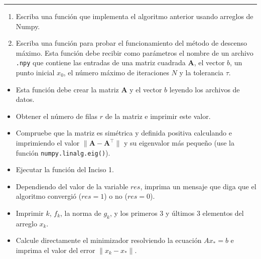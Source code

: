\documentclass[11pt]{article}
\providecommand{\tightlist}{%
      \setlength{\itemsep}{0pt}\setlength{\parskip}{0pt}}
\begin{document}
\begin{center}\rule{0.5\linewidth}{0.5pt}\end{center}

\begin{enumerate}
\def\labelenumi{\arabic{enumi}.}
\tightlist
\item
  Escriba una función que implementa el algoritmo anterior usando
  arreglos de Numpy.\\
\item
  Escriba una función para probar el funcionamiento del método de
  descenso máximo. Esta función debe recibir como parámetros el nombre
  de un archivo \texttt{.npy} que contiene las entradas de una matriz
  cuadrada \(\mathbf{A}\), el vector \(b\), un punto inicial \(x_0\), el
  número máximo de iteraciones \(N\) y la tolerancia \(\tau\).
\end{enumerate}

\begin{itemize}
\tightlist
\item
  Esta función debe crear la matriz \(\mathbf{A}\) y el vector \(b\)
  leyendo los archivos de datos.
\item
  Obtener el número de filas \(r\) de la matriz e imprimir este valor.
\item
  Compruebe que la matriz es simétrica y definida positiva calculando e
  imprimiendo el valor \(\|\mathbf{A} - \mathbf{A}^\top\|\) y su
  eigenvalor más pequeño (use la función \texttt{numpy.linalg.eig()}).
\item
  Ejecutar la función del Inciso 1.
\item
  Dependiendo del valor de la variable \(res\), imprima un mensaje que
  diga que el algoritmo convergió (\(res=1\)) o no (\(res=0\)).
\item
  Imprimir \(k\), \(f_k\), la norma de \(g_k\), y los primeros 3 y
  últimos 3 elementos del arreglo \(x_k\).
\item
  Calcule directamente el minimizador resolviendo la ecuación
  \(Ax_* = b\) e imprima el valor del error \(\|x_k - x_* \|\).
\end{itemize}
\end{document}
